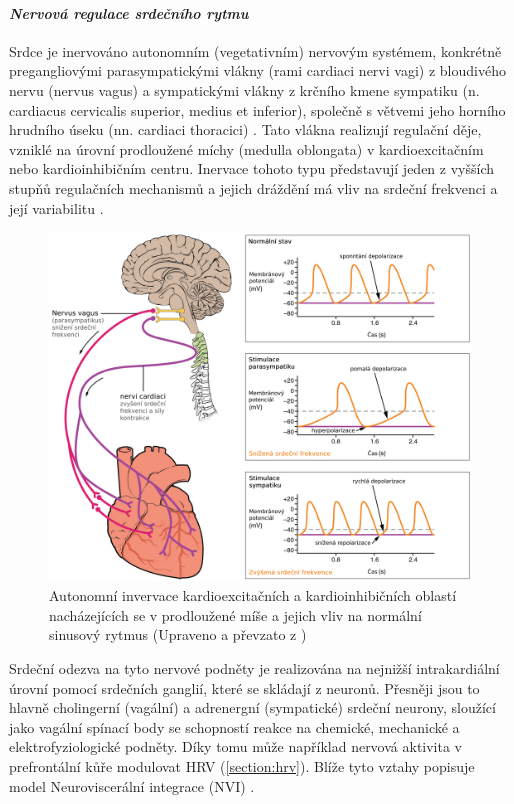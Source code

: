 \paragraph*{\textit{Nervová regulace srdečního rytmu}\\} Srdce je inervováno
autonomním (vegetativním) nervovým systémem, konkrétně pregangliovými
parasympatickými vlákny (rami cardiaci nervi vagi) z bloudivého nervu (nervus
vagus) a sympatickými vlákny z krčního kmene sympatiku (n. cardiacus cervicalis
superior, medius et inferior), společně s větvemi jeho horního hrudního úseku
(nn. cardiaci thoracici) \cite{Dylevsky2013,Kittnar2020}. Tato vlákna realizují
regulační děje, vzniklé na úrovní prodloužené míchy (medulla oblongata) v
kardioexcitačním nebo kardioinhibičním centru. Inervace tohoto typu představují
jeden z vyšších stupňů regulačních mechanismů a jejich dráždění má vliv na
srdeční frekvenci a její variabilitu \cite{Dylevsky2013,Trojan2002}.

\begin{figure}[h]
	\begin{center}
		\includegraphics[width=1\textwidth]{../assets/anatomy/hr_regulation}
		\caption{Autonomní invervace kardioexcitačních a kardioinhibičních
			oblastí nacházejících se v prodloužené míše a jejich vliv na
			normální sinusový rytmus (Upraveno a převzato z \cite{OpenStax})}
		\label{fig:hr_regulation}
	\end{center}
\end{figure}

Srdeční odezva na tyto nervové podněty je realizována na nejnižší intrakardiální
úrovní pomocí srdečních ganglií, které se skládají z neuronů. Přesněji jsou to
hlavně cholingerní (vagální) a adrenergní (sympatické) srdeční neurony, sloužící
jako vagální spínací body se schopností reakce na chemické, mechanické a
elektrofyziologické podněty. Díky tomu může například nervová aktivita v
prefrontální kůře modulovat HRV (\ref{section:hrv}). Blíže tyto vztahy popisuje
model Neuroviscerální integrace (NVI) \cite{Smith2017}.

